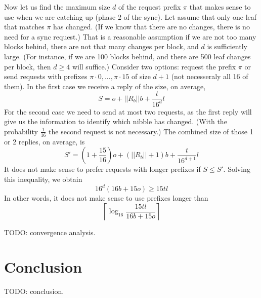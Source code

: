 \documentclass{amsart}
\begin{document}
Now let us find the maximum size $d$ of the request prefix $\pi$ that makes sense to use when we are catching up (phase 2 of the sync).
Let assume that only one leaf that matches $\pi$ has changed.
(If we know that there are no changes, there is no need for a sync request.)
That is a reasonable assumption if we are not too many blocks behind, there are not that many changes per block, and $d$ is sufficiently large.
(For instance, if we are 100 blocks behind, and there are 500 leaf changes per block, then $d \geq 4$ will suffice.)
Consider two options: request the prefix $\pi$ or send requests with prefixes $\pi \cdot 0, ..., \pi \cdot 15$ of size $d+1$
(not necesseraly all 16 of them).
In the first case we receive a reply of the size, on average,
\begin{equation}
    S = o + ||R_b|| b + \frac{t}{16^d} l
\end{equation}
For the second case we need to send at most two requests,
as the first reply will give us the information to identify which nibble has changed.
(With the probability $\frac{1}{16}$ the second request is not necessary.)
The combined size of those 1 or 2 replies, on average, is
\begin{equation}
    S' = \left( 1 + \frac{15}{16} \right) o + (||R_b|| + 1) b + \frac{t}{16^{d+1}} l
\end{equation}
It does not make sense to prefer requests with longer prefixes if $S \leq S'$.
Solving this inequality, we obtain
\begin{equation}
    16^d (16b + 15o) \geq 15tl
\end{equation}
In other words, it does not make sense to use prefixes longer than
\begin{equation}
\left\lceil \log_{16} \frac{15tl} {16b + 15o} \right\rceil
\end{equation}

TODO: convergence analysis.

\section{Conclusion}

TODO: conclusion.




\end{document}
